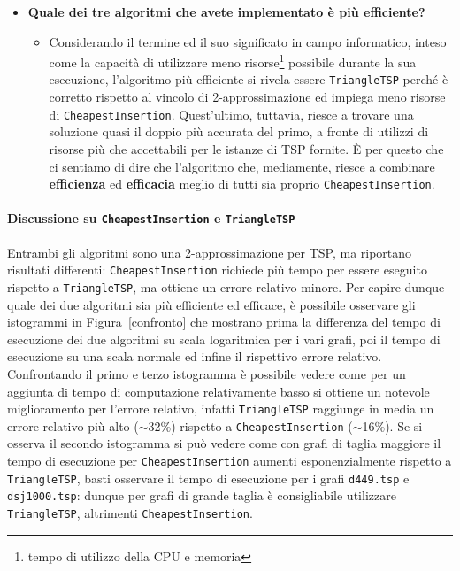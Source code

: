 \begin{itemize}
\begin{itemize}
	\end{itemize}
	\item \textbf{Quale dei tre algoritmi che avete implementato è più efficiente?}
	\begin{itemize}
		\item Considerando il termine  ed il suo significato in campo informatico, inteso come la capacità di utilizzare meno risorse\footnote{tempo di utilizzo della CPU e memoria} possibile durante la sua esecuzione, l'algoritmo più efficiente si rivela essere \texttt{TriangleTSP} perché è corretto rispetto al vincolo di 2-approssimazione ed impiega meno risorse di \texttt{CheapestInsertion}. Quest'ultimo, tuttavia, riesce a trovare una soluzione quasi il doppio più accurata del primo, a fronte di utilizzi di risorse più che accettabili per le istanze di TSP fornite. \`{E} per questo che ci sentiamo di dire che l'algoritmo che, mediamente, riesce a combinare \textbf{efficienza} ed \textbf{efficacia} meglio di tutti sia proprio \texttt{CheapestInsertion}.
	\end{itemize}
\end{itemize}


\paragraph{Discussione su \texttt{CheapestInsertion} e \texttt{TriangleTSP}} \label{ci-ttsp}
Entrambi gli algoritmi sono una 2-approssimazione per TSP, ma riportano risultati differenti: \texttt{CheapestInsertion} richiede più tempo per essere eseguito rispetto a \texttt{TriangleTSP}, ma ottiene un errore relativo minore.\eqcapo 
Per capire dunque quale dei due algoritmi sia più efficiente ed efficace, è possibile osservare gli istogrammi in Figura~\ref{confronto} che mostrano prima la differenza del tempo di esecuzione dei due algoritmi su scala logaritmica per i vari grafi, poi il tempo di esecuzione su una scala normale ed infine il rispettivo errore relativo. Confrontando il primo e terzo istogramma è possibile vedere come per un aggiunta di tempo di computazione relativamente basso si ottiene un notevole miglioramento per l'errore relativo, infatti \texttt{TriangleTSP} raggiunge in media un errore relativo più alto ($\sim$32\%) rispetto a \texttt{CheapestInsertion} ($\sim$16\%). Se si osserva il secondo istogramma si può vedere come con grafi di taglia maggiore il tempo di esecuzione per \texttt{CheapestInsertion} aumenti esponenzialmente rispetto a \texttt{TriangleTSP}, basti osservare il tempo di esecuzione per i grafi \texttt{d449.tsp} e \texttt{dsj1000.tsp}: dunque per grafi di grande taglia è consigliabile utilizzare \texttt{TriangleTSP}, altrimenti \texttt{CheapestInsertion}.

